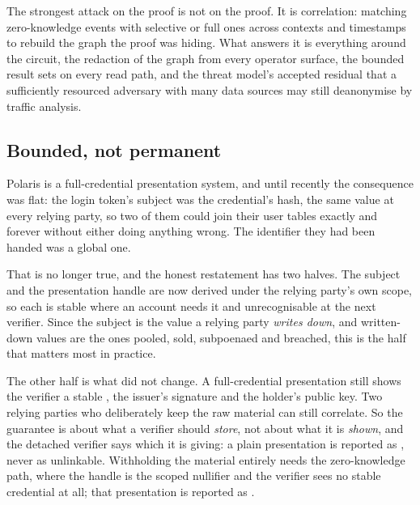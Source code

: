 The strongest attack on the proof is not on the proof. It is correlation: matching zero-knowledge
events with selective or full ones across contexts and timestamps to rebuild the graph the proof was
hiding. What answers it is everything around the circuit, the redaction of the graph from every
operator surface, the bounded result sets on every read path, and the threat model's accepted
residual that a sufficiently resourced adversary with many data sources may still deanonymise by
traffic analysis.


\subsection{Bounded, not permanent}

Polaris is a full-credential presentation system, and until recently the consequence was flat: the
login token's subject was the credential's hash, the same value at every relying party, so two of
them could join their user tables exactly and forever without either doing anything wrong. The
identifier they had been handed was a global one.

That is no longer true, and the honest restatement has two halves. The subject and the presentation
handle are now derived under the relying party's own scope, so each is stable where an account needs
it and unrecognisable at the next verifier. Since the subject is the value a relying party
\emph{writes down}, and written-down values are the ones pooled, sold, subpoenaed and breached, this
is the half that matters most in practice. \sImpl

The other half is what did not change. A full-credential presentation still shows the verifier a
stable , the issuer's signature and the holder's public key. Two relying parties
who deliberately keep the raw material can still correlate. So the guarantee is about what a verifier
should \emph{store}, not about what it is \emph{shown}, and the detached verifier says which it is
giving: a plain presentation is reported as , never as unlinkable. Withholding the
material entirely needs the zero-knowledge path, where the handle is the scoped nullifier and the
verifier sees no stable credential at all; that presentation is reported as .

